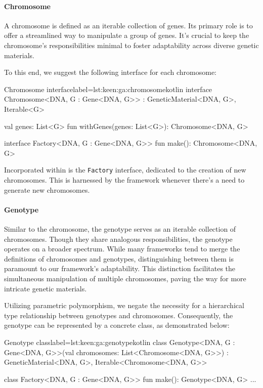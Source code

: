  \paragraph{Chromosome}
    A chromosome is defined as an iterable collection of genes.
    Its primary role is to offer a streamlined way to manipulate a group 
    of genes.
    It's crucial to keep the chromosome's responsibilities minimal to 
    foster adaptability across diverse genetic materials.
    
    To this end, we suggest the following interface for each chromosome:
    
    \begin{code}{Chromosome interface}{label={lst:keen:ga:chromosome}}{kotlin}
      interface Chromosome<DNA, G : Gene<DNA, G>> : GeneticMaterial<DNA, G>, 
                                                    Iterable<G> {
          val genes: List<G>
          fun withGenes(genes: List<G>): Chromosome<DNA, G>
    
          interface Factory<DNA, G : Gene<DNA, G>> {
              fun make(): Chromosome<DNA, G>
          }
      }
    \end{code}
    
    Incorporated within is the \texttt{Factory} interface, dedicated to 
    the creation of new chromosomes.
    This is harnessed by the framework whenever there's a need to generate 
    new chromosomes.

  \paragraph{Genotype}
    Similar to the chromosome, the genotype serves as an iterable collection 
    of chromosomes.
    Though they share analogous responsibilities, the genotype operates on a 
    broader spectrum.
    While many frameworks tend to merge the definitions of chromosomes and 
    genotypes, distinguishing between them is paramount to our framework's 
    adaptability.
    This distinction facilitates the simultaneous manipulation of multiple 
    chromosomes, paving the way for more intricate genetic materials.
    
    Utilizing parametric polymorphism, we negate the necessity for a 
    hierarchical type relationship between genotypes and chromosomes.
    Consequently, the genotype can be represented by a concrete class, as 
    demonstrated below:
    
    \begin{code}{Genotype class}{label={lst:keen:ga:genotype}}{kotlin}
      class Genotype<DNA, G : Gene<DNA, G>>(val chromosomes: List<Chromosome<DNA, G>>) :
          GeneticMaterial<DNA, G>, Iterable<Chromosome<DNA, G>> {
    
          class Factory<DNA, G : Gene<DNA, G>> {
              fun make(): Genotype<DNA, G> { ... }
          }
      }
    \end{code}
    
